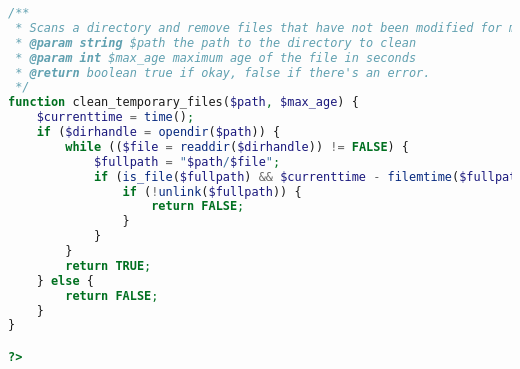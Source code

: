\begin{lstlisting}[language=PHP,basicstyle=\tiny,caption=handle.php,label={lst:handle.php}]
/**
 * Scans a directory and remove files that have not been modified for max_age
 * @param string $path the path to the directory to clean 
 * @param int $max_age maximum age of the file in seconds
 * @return boolean true if okay, false if there's an error.
 */
function clean_temporary_files($path, $max_age) {
	$currenttime = time();
	if ($dirhandle = opendir($path)) {
		while (($file = readdir($dirhandle)) != FALSE) {
			$fullpath = "$path/$file";
			if (is_file($fullpath) && $currenttime - filemtime($fullpath) > $max_age) {
				if (!unlink($fullpath)) {
					return FALSE;
				}
			}
		}
		return TRUE;
	} else {
		return FALSE;
	}
}

?>
\end{lstlisting}